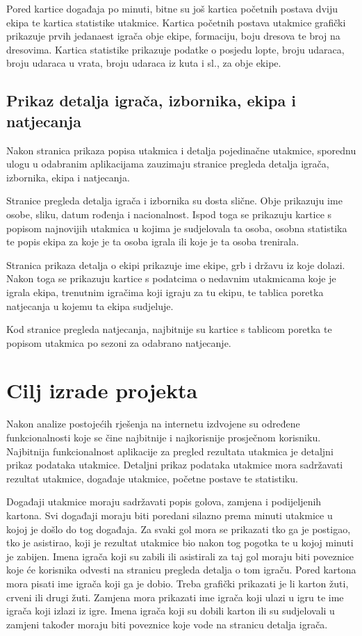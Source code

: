 \documentclass[times, utf8, zavrsni]{fer}
\begin{document}
Pored kartice događaja po minuti, bitne su još kartica početnih postava dviju ekipa te kartica statistike utakmice.
Kartica početnih postava utakmice grafički prikazuje prvih jedanaest igrača obje ekipe, formaciju, boju dresova te broj na dresovima.
Kartica statistike prikazuje podatke o posjedu lopte, broju udaraca, broju udaraca u vrata, broju udaraca iz kuta i sl., za obje ekipe.


\section{Prikaz detalja igrača, izbornika, ekipa i natjecanja}

Nakon stranica prikaza popisa utakmica i detalja pojedinačne utakmice, sporednu ulogu u odabranim aplikacijama zauzimaju stranice pregleda detalja igrača, izbornika, ekipa i natjecanja.

Stranice pregleda detalja igrača i izbornika su dosta slične. Obje prikazuju ime osobe, sliku, datum rođenja i nacionalnost.
Ispod toga se prikazuju kartice s popisom najnovijih utakmica u kojima je sudjelovala ta osoba, osobna statistika te popis ekipa za koje je ta osoba igrala ili koje je ta osoba trenirala.

Stranica prikaza detalja o ekipi prikazuje ime ekipe, grb i državu iz koje dolazi. Nakon toga se prikazuju kartice s podatcima o nedavnim utakmicama koje je igrala ekipa,
trenutnim igračima koji igraju za tu ekipu, te tablica poretka natjecanja u kojemu ta ekipa sudjeluje.

Kod stranice pregleda natjecanja, najbitnije su kartice s tablicom poretka te popisom utakmica po sezoni za odabrano natjecanje.

\chapter{Cilj izrade projekta}

Nakon analize postojećih rješenja na internetu izdvojene su određene funkcionalnosti koje se čine najbitnije i najkorisnije prosječnom korisniku.
Najbitnija funkcionalnost aplikacije za pregled rezultata utakmica je detaljni prikaz podataka utakmice.
Detaljni prikaz podataka utakmice mora sadržavati rezultat utakmice, događaje utakmice, početne postave te statistiku.

Događaji utakmice moraju sadržavati popis golova, zamjena i podijeljenih kartona. Svi događaji moraju biti poredani silazno prema minuti utakmice u kojoj je došlo do tog događaja.
Za svaki gol mora se prikazati tko ga je postigao, tko je asistirao, koji je rezultat utakmice bio nakon tog pogotka te u kojoj minuti je zabijen.
Imena igrača koji su zabili ili asistirali za taj gol moraju biti poveznice koje će korisnika odvesti na stranicu pregleda detalja o tom igraču.
Pored kartona mora pisati ime igrača koji ga je dobio.
Treba grafički prikazati je li karton žuti, crveni ili drugi žuti.
Zamjena mora prikazati ime igrača koji ulazi u igru te ime igrača koji izlazi iz igre.
Imena igrača koji su dobili karton ili su sudjelovali u zamjeni također moraju biti poveznice koje vode na stranicu detalja igrača.
\end{document}
